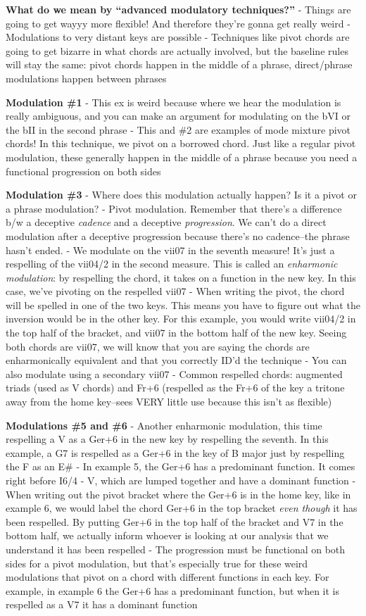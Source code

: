 \documentclass{book}
\begin{document}
\textbf{What do we mean by ``advanced modulatory techniques?''} - Things are
going to get wayyy more flexible! And therefore they're gonna get really weird
- Modulations to very distant keys are possible - Techniques like pivot chords
are going to get bizarre in what chords are actually involved, but the
baseline rules will stay the same: pivot chords happen in the middle of a
phrase, direct/phrase modulations happen between phrases

\textbf{Modulation \#1} - This ex is weird because where we hear the
modulation is really ambiguous, and you can make an argument for modulating on
the bVI or the bII in the second phrase - This and \#2 are examples of mode
mixture pivot chords! In this technique, we pivot on a borrowed chord. Just
like a regular pivot modulation, these generally happen in the middle of a
phrase because you need a functional progression on both sides

\textbf{Modulation \#3} - Where does this modulation actually happen? Is it a
pivot or a phrase modulation? - Pivot modulation. Remember that there's a
difference b/w a deceptive \emph{cadence} and a deceptive \emph{progression}.
We can't do a direct modulation after a deceptive progression because there's
no cadence--the phrase hasn't ended. - We modulate on the vii07 in the seventh
measure! It's just a respelling of the vii04/2 in the second measure. This is
called an \emph{enharmonic modulation}: by respelling the chord, it takes on a
function in the new key. In this case, we've pivoting on the respelled vii07 -
When writing the pivot, the chord will be spelled in one of the two keys. This
means you have to figure out what the inversion would be in the other key. For
this example, you would write vii04/2 in the top half of the bracket, and
vii07 in the bottom half of the new key. Seeing both chords are vii07, we will
know that you are saying the chords are enharmonically equivalent and that you
correctly ID'd the technique - You can also modulate using a secondary vii07 -
Common respelled chords: augmented triads (used as V chords) and Fr+6
(respelled as the Fr+6 of the key a tritone away from the home key--sees VERY
little use because this isn't as flexible)

\textbf{Modulations \#5 and \#6} - Another enharmonic modulation, this time
respelling a V as a Ger+6 in the new key by respelling the seventh. In this
example, a G7 is respelled as a Ger+6 in the key of B major just by respelling
the F as an E\# - In example 5, the Ger+6 has a predominant function. It comes
right before I6/4 - V, which are lumped together and have a dominant function
- When writing out the pivot bracket where the Ger+6 is in the home key, like
in example 6, we would label the chord Ger+6 in the top bracket \emph{even
though} it has been respelled. By putting Ger+6 in the top half of the bracket
and V7 in the bottom half, we actually inform whoever is looking at our
analysis that we understand it has been respelled - The progression must be
functional on both sides for a pivot modulation, but that's especially true
for these weird modulations that pivot on a chord with different functions in
each key. For example, in example 6 the Ger+6 has a predominant function, but
when it is respelled as a V7 it has a dominant function
\end{document}
